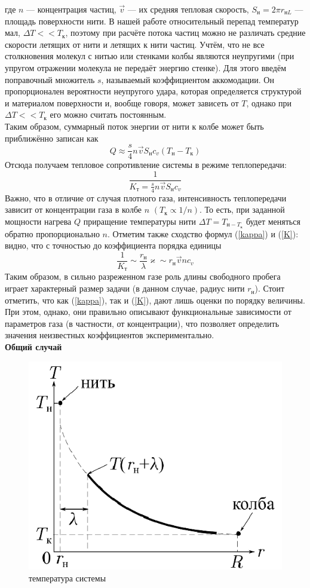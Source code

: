 \documentclass[12pt]{article}
\begin{document}
        где $n$ — концентрация частиц, $\vec{v}$ — их средняя тепловая скорость, $S_\text{н} = 2\pi r_{\text{н}L}$ — площадь поверхности нити. 
        В нашей работе относительный перепад температур мал, $\Delta T << T_\text{к}$, поэтому при расчёте потока частиц можно не
        различать средние скорости летящих от нити и летящих к нити частиц. Учтём, что не все столкновения молекул с нитью или 
        стенками колбы являются неупругими (при упругом отражении молекула не передаёт энергию
        стенке). Для этого введём поправочный множитель $s$, называемый коэффициентом аккомодации. Он пропорционален вероятности неупругого удара,
        которая определяется структурой и материалом поверхности и, вообще говоря, может зависеть от $T$, однако при $\Delta T << T_{\text{к}}$ 
        его можно считать постоянным.\\
        Таким образом, суммарный поток энергии от нити к колбе может быть приближённо записан как
        \[
            Q \approx \frac{s}{4} n \vec{v} S_{\text{н}}c_v(T_\text{н}-T_{\text{к}}) 
        \]
        Отсюда получаем тепловое сопротивление системы в режиме теплопередачи:
        \begin{equation}\label{K}
            \frac{1}{K_{\text{т}} = \frac{s}{4} n \vec{v} S_{\text{н}}c_v}
        \end{equation}
        Важно, что в отличие от случая плотного газа, интенсивность теплопередачи зависит от концентрации газа в колбе $n$ $(T_{\text{к}} \propto 1/n)$. То есть, 
        при заданной мощности нагрева $Q$ приращение температуры нити $\Delta T = T_{\text{н}-T_{\text{к}}}$ будет
        меняться обратно пропорционально $n$. Отметим также сходство формул (\ref{kappa}) и (\ref{K}): видно, что с точностью до коэффициента порядка единицы
        \[
            \frac{1}{K_{\text{т}}} \sim \frac{r_{\text{н}}}{\lambda}\varkappa \sim r_{\text{н}}\vec{v}nc_v
        \]
        Таким образом, в сильно разреженном газе роль длины свободного пробега
        играет характерный размер задачи (в данном случае, радиус нити $r_{\text{н}}$). Стоит отметить, что как (\ref{kappa}), так и (\ref{K}), дают лишь оценки по порядку
        величины. При этом, однако, они правильно описывают функциональные зависимости от параметров газа (в частности, от концентрации), что позволяет
        определить значения неизвестных коэффициентов экспериментально.\\
        \textbf{Общий случай}
        \begin{figure}[H]
            \centering
            \includegraphics[width=0.4\linewidth]{system_tempetatute.png}
            \caption{температура системы}
            \label{fig:mpr}
        \end{figure}
\end{document}

